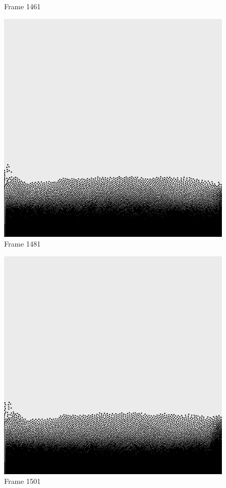 \documentclass[a4paper, 12pt, oneside]{book}
\begin{document}
\begin{figure}[!ht]
\begin{center}
            Frame 1461
        \end{center}
    \endminipage
    \hfill
        \begin{center}
            \includegraphics[width=\linewidth]{images/test_case_2/1481.png}
            Frame 1481
        \end{center}
    \endminipage
    \hfill
        \begin{center}
            \includegraphics[width=\linewidth]{images/test_case_2/1501.png}
            Frame 1501
        \end{center}
    \endminipage
    \hfill


\end{figure}
\end{document}
